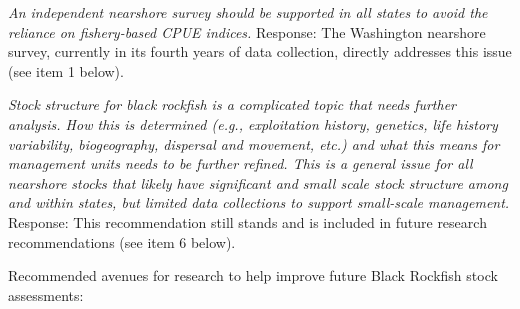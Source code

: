 \documentclass[11pt,
  english,
  letterpaper,
]{article}
\begin{document}
\textit{An independent nearshore survey should be supported in all states to avoid the reliance on fishery-based CPUE indices.} Response: The Washington nearshore survey, currently in its fourth years of data collection, directly addresses this issue (see item 1 below).

\textit{Stock structure for black rockfish is a complicated topic that needs further analysis. How this is determined (e.g., exploitation history, genetics, life history variability, biogeography, dispersal and movement, etc.) and what this means for management units needs to be further refined. This is a general issue for all nearshore stocks that likely have significant and small scale stock structure among and within states, but limited data collections to support small-scale management.} Response: This recommendation still stands and is included in future research recommendations (see item 6 below).

Recommended avenues for research to help improve future Black Rockfish stock assessments:
\end{document}
